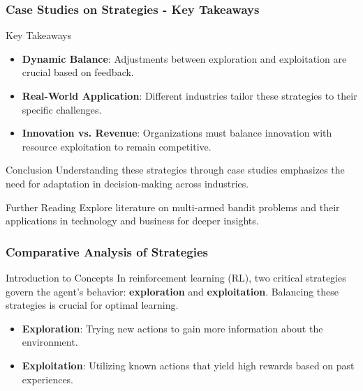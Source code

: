 \documentclass[aspectratio=169]{beamer}
\begin{document}
\begin{frame}[fragile]
    \frametitle{Case Studies on Strategies - Key Takeaways}
    \begin{block}{Key Takeaways}
        \begin{itemize}
            \item \textbf{Dynamic Balance}: Adjustments between exploration and exploitation are crucial based on feedback.
            \item \textbf{Real-World Application}: Different industries tailor these strategies to their specific challenges.
            \item \textbf{Innovation vs. Revenue}: Organizations must balance innovation with resource exploitation to remain competitive.
        \end{itemize}
    \end{block}
    
    \begin{block}{Conclusion}
        Understanding these strategies through case studies emphasizes the need for adaptation in decision-making across industries.
    \end{block}
    
    \begin{block}{Further Reading}
        Explore literature on multi-armed bandit problems and their applications in technology and business for deeper insights.
    \end{block}
\end{frame}

\begin{frame}[fragile]
    \frametitle{Comparative Analysis of Strategies}
    \begin{block}{Introduction to Concepts}
        In reinforcement learning (RL), two critical strategies govern the agent's behavior: \textbf{exploration} and \textbf{exploitation}. 
        Balancing these strategies is crucial for optimal learning.
    \end{block}
    \begin{itemize}
        \item \textbf{Exploration}: Trying new actions to gain more information about the environment.
        \item \textbf{Exploitation}: Utilizing known actions that yield high rewards based on past experiences.
    \end{itemize}
\end{frame}
\end{document}
